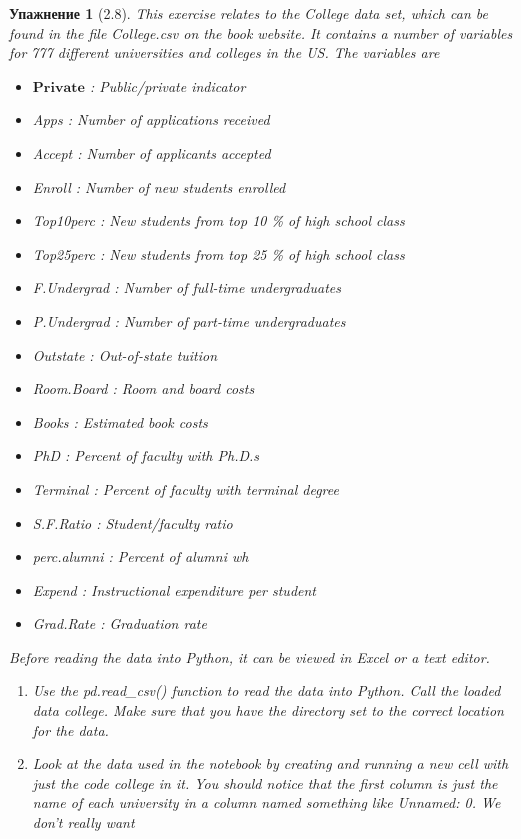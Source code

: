 \documentclass{article}
\newtheorem{exercise}[subsubsection]{Упажнение}
\begin{document}
	\begin{exercise}[2.8]
		This exercise relates to the College data set, which can be found in
		the file College.csv on the book website. It contains a number of
		variables for 777 different universities and colleges in the US. The
		variables are
		\begin{itemize}
			\item $\mathbf{Private}$ : Public/private indicator
			\item Apps : Number of applications received
			\item Accept : Number of applicants accepted
			\item Enroll : Number of new students enrolled
			\item Top10perc : New students from top 10 \% of high school class
			\item Top25perc : New students from top 25 \% of high school class
			\item F.Undergrad : Number of full-time undergraduates
			\item P.Undergrad : Number of part-time undergraduates
			\item Outstate : Out-of-state tuition
			\item Room.Board : Room and board costs
			\item Books : Estimated book costs
			\item PhD : Percent of faculty with Ph.D.s
			\item  Terminal : Percent of faculty with terminal degree
			\item S.F.Ratio : Student/faculty ratio
			\item perc.alumni : Percent of alumni wh
			\item Expend : Instructional expenditure per student
			\item Grad.Rate : Graduation rate
		\end{itemize}
	 Before reading the data into Python, it can be viewed in Excel or a
	 text editor.
	\begin{enumerate}[label=(\alph*)]
		\item  Use the pd.read\_csv() function to read the data into Python. Call
		the loaded data college. Make sure that you have the directory
		set to the correct location for the data.
		\item Look at the data used in the notebook by creating and running
		a new cell with just the code college in it. You should notice
		that the first column is just the name of each university in a
		column named something like Unnamed: 0. We don’t really want

\end{enumerate}
\end{exercise}
\end{document}
